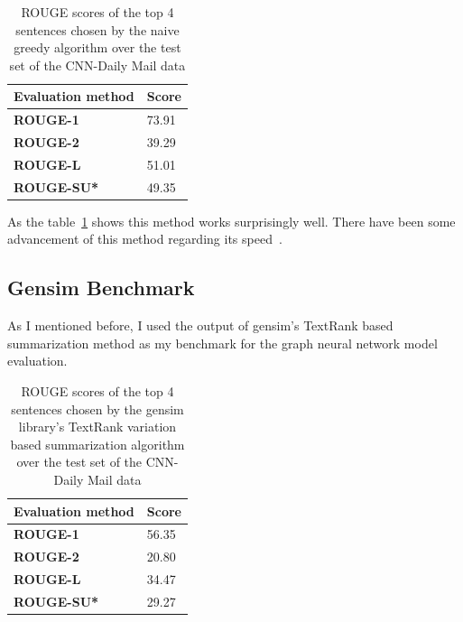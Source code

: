 \begin{table}[!ht]
	\centering
	\begin{tabular}{| l | l |}
		\hline
		\textbf{Evaluation method}&\textbf{Score}\\ \hline \hline
		\textbf{ROUGE-1}&73.91\\ \hline
		\textbf{ROUGE-2}&39.29 \\ \hline
		\textbf{ROUGE-L}&51.01 \\ \hline
		\textbf{ROUGE-SU*}&49.35 \\ \hline
	\end{tabular}
	\caption{ROUGE scores of the top 4 sentences chosen by the naive greedy algorithm over the test set of the CNN-Daily Mail data}
	\label{tab:extr}
\end{table}
As the table~\ref{tab:extr} shows this method works surprisingly well. There have been some advancement of this method regarding its speed~\cite{GreedySum}.

\subsection{Gensim Benchmark}
As I mentioned before, I used the output of gensim's TextRank based summarization method as my benchmark for the graph neural network model evaluation.
\begin{table}[!ht]
	\centering
	\begin{tabular}{| l | l |}
		\hline
		\textbf{Evaluation method}&\textbf{Score}\\ \hline \hline
		\textbf{ROUGE-1}&56.35 \\ \hline
		\textbf{ROUGE-2}&20.80 \\ \hline
		\textbf{ROUGE-L}&34.47 \\ \hline
		\textbf{ROUGE-SU*}&29.27 \\ \hline
	\end{tabular}
	\caption{ROUGE scores of the top 4 sentences chosen by the gensim library's TextRank variation based summarization algorithm over the test set of the CNN-Daily Mail data}
\end{table}
\FloatBarrier


